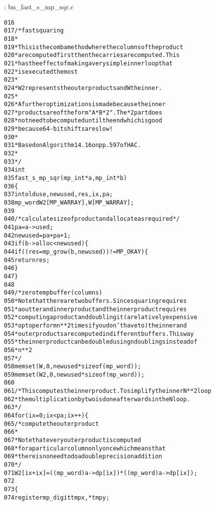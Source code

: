 \documentclass[b5paper]{book}
\begin{document}
\vspace{+3mm}\begin{small}
\hspace{-5.1mm}{\bf File}: bn\_fast\_s\_mp\_sqr.c
\vspace{-3mm}
\begin{alltt}
016   
017   /* fast squaring
018    *
019    * This is the comba method where the columns of the product 
020    * are computed first then the carries are computed.  This 
021    * has the effect of making a very simple inner loop that 
022    * is executed the most
023    *
024    * W2 represents the outer products and W the inner.
025    *
026    * A further optimizations is made because the inner 
027    * products are of the form "A * B * 2".  The *2 part does 
028    * not need to be computed until the end which is good 
029    * because 64-bit shifts are slow!
030    *
031    * Based on Algorithm 14.16 on pp.597 of HAC.
032    *
033    */
034   int
035   fast_s_mp_sqr (mp_int * a, mp_int * b)
036   \{
037     int     olduse, newused, res, ix, pa;
038     mp_word W2[MP_WARRAY], W[MP_WARRAY];
039   
040     /* calculate size of product and allocate as required */
041     pa = a->used;
042     newused = pa + pa + 1;
043     if (b->alloc < newused) \{
044       if ((res = mp_grow (b, newused)) != MP_OKAY) \{
045         return res;
046       \}
047     \}
048   
049     /* zero temp buffer (columns)
050      * Note that there are two buffers.  Since squaring requires
051      * a outter and inner product and the inner product requires
052      * computing a product and doubling it (a relatively expensive
053      * op to perform n**2 times if you don't have to) the inner and
054      * outer products are computed in different buffers.  This way
055      * the inner product can be doubled using n doublings instead of
056      * n**2
057      */
058     memset (W, 0, newused * sizeof (mp_word));
059     memset (W2, 0, newused * sizeof (mp_word));
060   
061     /* This computes the inner product.  To simplify the inner N**2 loop
062      * the multiplication by two is done afterwards in the N loop.
063      */
064     for (ix = 0; ix < pa; ix++) \{
065       /* compute the outer product
066        *
067        * Note that every outer product is computed
068        * for a particular column only once which means that
069        * there is no need todo a double precision addition
070        */
071       W2[ix + ix] = ((mp_word) a->dp[ix]) * ((mp_word) a->dp[ix]);
072   
073       \{
074         register mp_digit tmpx, *tmpy;

\end{alltt}
\end{small}
\end{document}
